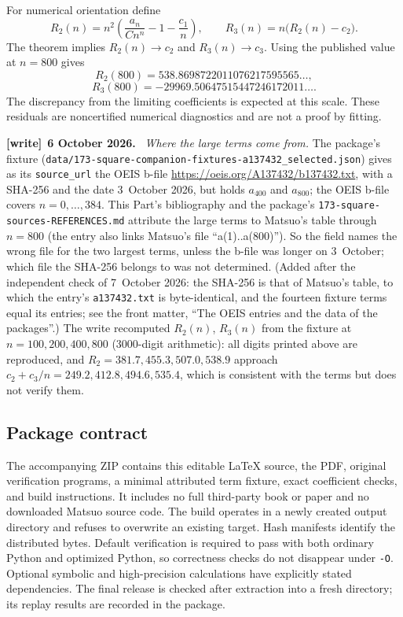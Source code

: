 \documentclass[11pt,letterpaper]{article}
\numberwithin{equation}{section}
\theoremstyle{remark}\newtheorem{remark}[theorem]{Remark}
\newcommand{\file}[1]{\nolinkurl{#1}}
\newenvironment{writenote}[1][]{\par\smallskip\begingroup\small
 \noindent\textbf{[write]}\if\relax\detokenize{#1}\relax\else~\textbf{#1.}\fi\ }%
 {\par\endgroup\smallskip}
\begin{document}
For numerical orientation define
\[
R_2(n)=n^2\left(\frac{a_n}{Cn^n}-1-\frac{c_1}{n}\right),\qquad
R_3(n)=n\bigl(R_2(n)-c_2\bigr).
\]
The theorem implies $R_2(n)\to c_2$ and $R_3(n)\to c_3$. Using the published value at $n=800$ gives
\[
R_2(800)=538.8698722011076217595565\ldots,
\]
\[
R_3(800)=-29969.50647515447246172011\ldots.
\]
The discrepancy from the limiting coefficients is expected at this scale. These residuals are noncertified numerical diagnostics and are not a proof by fitting.
\begin{writenote}[6 October 2026]
\emph{Where the large terms come from.} The package's fixture (\file{data/173-square-companion-fixtures-a137432_selected.json}) gives as its \texttt{source\_url} the OEIS b-file \url{https://oeis.org/A137432/b137432.txt}, with a SHA-256 and the date 3~October 2026, but holds $a_{400}$ and $a_{800}$; the OEIS b-file covers $n=0,\dots,384$. This Part's bibliography \cite{matsuoTable} and the package's \file{173-square-sources-REFERENCES.md} attribute the large terms to Matsuo's table through $n=800$ (the entry also links Matsuo's file ``a(1)..a(800)''). So the field names the wrong file for the two largest terms, unless the b-file was longer on 3~October; which file the SHA-256 belongs to was not determined. \textup{(Added after the independent check of 7~October 2026: the SHA-256 is that of Matsuo's table, to which the entry's \file{a137432.txt} is byte-identical, and the fourteen fixture terms equal its entries; see the front matter, ``The OEIS entries and the data of the packages''.)} The write recomputed $R_2(n)$, $R_3(n)$ from the fixture at $n=100,200,400,800$ (3000-digit arithmetic): all digits printed above are reproduced, and $R_2=381.7,455.3,507.0,538.9$ approach $c_2+c_3/n=249.2,412.8,494.6,535.4$, which is consistent with the terms but does not verify them.
\end{writenote}

\subsection{Package contract}
The accompanying ZIP contains this editable \LaTeX{} source, the PDF, original verification programs, a minimal attributed term fixture, exact coefficient checks, and build instructions. It includes no full third-party book or paper and no downloaded Matsuo source code. The build operates in a newly created output directory and refuses to overwrite an existing target. Hash manifests identify the distributed bytes. Default verification is required to pass with both ordinary Python and optimized Python, so correctness checks do not disappear under \texttt{-O}. Optional symbolic and high-precision calculations have explicitly stated dependencies. The final release is checked after extraction into a fresh directory; its replay results are recorded in the package.
\end{document}
